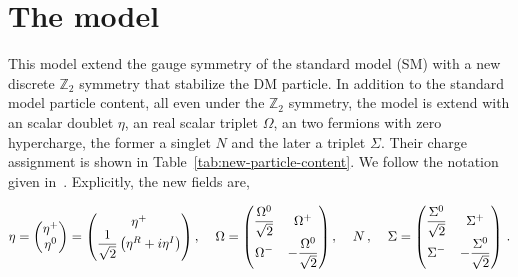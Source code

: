 \documentclass[12pt,letterpaper]{article}
\begin{document}
\section{The model}
\label{sec:model}

This model extend the gauge symmetry of the standard model (SM) with a new discrete $\mathbb{Z}_2$ symmetry that stabilize the DM particle. In addition to the standard model particle content, all even under the $\mathbb{Z}_2$ symmetry, the model is extend with an scalar doublet $\eta$, an real scalar triplet $\Omega$, an two fermions with zero hypercharge, the former a singlet $N$ and the later a triplet $\Sigma$. Their charge assignment is shown in Table~\ref{tab:new-particle-content}. We follow the notation given in~\cite{Merle:2016scw, Rocha-Moran:2016enp}. Explicitly, the new fields are,

\begin{align}
\eta = 
\begin{pmatrix}
\eta^+ \\
\eta^0
\end{pmatrix}
=\begin{pmatrix}
\eta^+ \\
\dfrac{1}{\sqrt{2}}\left(\eta^R+i\eta^I\right)
\end{pmatrix}, \;\hspace{0.3 cm}
\Omega = 
\begin{pmatrix}
\dfrac{\Omega^0}{\sqrt{2}} & \Omega^+ \\
\Omega^- & -\dfrac{\Omega^0}{\sqrt{2}}
\end{pmatrix}, \;\hspace{0.3 cm}
N\,, \;\hspace{0.3 cm}
\Sigma = 
\begin{pmatrix}
\dfrac{\Sigma^0}{\sqrt{2}} & \Sigma^+ \\
\Sigma^- & -\dfrac{\Sigma^0}{\sqrt{2}}
\end{pmatrix}\,.
\end{align}

   
\end{document}
